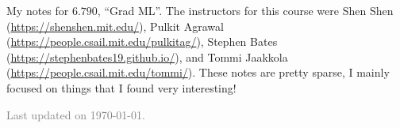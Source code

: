 \documentclass[11pt]{article}
\begin{document}
\maketitle

My notes for $6.790$, ``Grad ML''. The instructors for this course were Shen Shen (\url{https://shenshen.mit.edu/}), Pulkit Agrawal (\url{https://people.csail.mit.edu/pulkitag/}), Stephen Bates (\url{https://stephenbates19.github.io/}), and Tommi Jaakkola (\url{https://people.csail.mit.edu/tommi/}). These notes are pretty sparse, I mainly focused on things that I found very interesting!

\vfill

\hfill \textcolor{gray}{\small Last updated on \today.}
\newpage
\tableofcontents 
\newpage
\importfiles %
\end{document}
